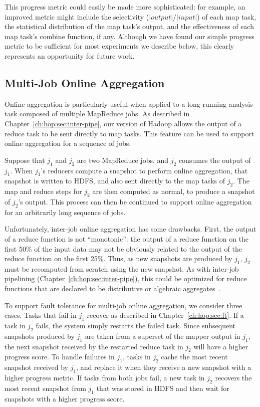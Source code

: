 This progress metric could easily be made more sophisticated: for example, an
improved metric might include the selectivity ($|output|/|input|$) of each map task, the
statistical distribution of the map task's output, and the effectiveness of each
map task's combine function, if any. 
Although we have found our simple progress metric to be
sufficient for most experiments we describe below, this clearly
represents an opportunity for future work.

\subsection{Multi-Job Online Aggregation}
\label{ch:hop:sec:online-multi}

Online aggregation is particularly useful when applied to a long-running
analysis task composed of multiple MapReduce jobs.  As described in
Chapter~\ref{ch:hop:sec:inter-pipe}, our version of Hadoop allows the output of
a reduce task to be sent directly to map tasks.  This feature can be used to
support online aggregation for a sequence of jobs.

Suppose that $j_1$ and $j_2$ are two MapReduce jobs, and $j_2$ consumes the
output of $j_1$.  When $j_1$'s reducers compute a snapshot to perform online
aggregation, that snapshot is written to HDFS, and also sent directly to the
map tasks of $j_2$.  The map and reduce steps for $j_2$ are then computed as
normal, to produce a snapshot of $j_2$'s output.  This process can then be
continued to support online aggregation for an arbitrarily long sequence of
jobs.
  
Unfortunately, inter-job online aggregation has some drawbacks.  First, the
output of a reduce function is not ``monotonic'': the output of a reduce
function on the first 50\% of the input data may not be obviously related to
the output of the reduce function on the first 25\%.  Thus, as new snapshots
are produced by $j_1$, $j_2$ must be recomputed from scratch using the new
snapshot.  As with inter-job pipelining (Chapter~\ref{ch:hop:sec:inter-pipe}),
this could be optimized for reduce functions that are declared to be
distributive or algebraic aggregates~\cite{datacube}.

To support fault tolerance for multi-job online aggregation, we consider three
cases. Tasks that fail in $j_1$ recover as described in Chapter~\ref{ch:hop:sec:ft}.
If a task in $j_2$ fails, the system simply restarts the failed task. Since
subsequent snapshots produced by $j_1$ are taken from a superset of the mapper
output in $j_1$, the next snapshot received by the restarted reduce task in
$j_2$ will have a higher progress score. To handle failures in $j_1$, tasks in
$j_2$ cache the most recent snapshot received by $j_1$, and replace it when they
receive a new snapshot with a higher progress metric. If tasks from both jobs
fail, a new task in $j_2$ recovers the most recent snapshot from $j_1$ that was
stored in HDFS and then wait for snapshots with a higher progress score.

